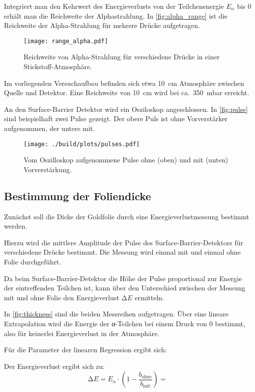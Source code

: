 Integriert man den Kehrwert des Energieverlusts von der Teilchenenergie $E_{\alpha}$ bis $0$ erhält man die Reichweite der Alphastrahlung.
In \autoref{fig:alpha_range} ist die Reichweite der Alpha-Strahlung für mehrere Drücke aufgetragen.

\begin{figure}
  \centering
  \texttt{[image: range\_alpha.pdf]}
  \caption{Reichweite von Alpha-Strahlung für verschiedene Drücke in einer Stickstoff-Atmosphäre.}
  \label{fig:alpha_range}
\end{figure}

Im vorliegenden Versuchaufbau befinden sich etwa \SI{10}{\cm} Atmosphäre zwischen Quelle und Detektor.
Eine Reichweite von \SI{10}{\centi\meter} wird bei ca.\  \SI{350}{\milli\bar} erreicht.

An den Surface-Barrier Detektor wird ein Osziloskop angeschlossen.
In \autoref{fig:pulse} sind beispielhaft zwei Pulse gezeigt.
Der obere Puls ist ohne Vorverstärker aufgenommen, der untere mit.

\begin{figure}
  \centering
  \texttt{[image: ./build/plots/pulses.pdf]}
  \caption{%
    Vom Oszilloskop aufgenommene Pulse ohne (oben) und mit (unten) Vorverstärkung.
  }%
  \label{fig:pulse}
\end{figure}


\subsection{Bestimmung der Foliendicke}

Zunächst soll die Dicke der Goldfolie durch eine Energieverlustmessung bestimmt werden.

Hierzu wird die mittlere Amplitude der Pulse des
Surface-Barrier-Detektors für verschiedene Drücke bestimmt.
Die Messung wird einmal mit und einmal ohne Folie durchgeführt.

Da beim Surface-Barrier-Detektor die Höhe der Pulse proportional zur Energie der eintreffenden Teilchen ist,
kann über den Unterschied zwischen der Messung mit und ohne Folie den Energieverlust $\increment E$ ermitteln.

In \autoref{fig:thickness} sind die beiden Messreihen aufgetragen.
Über eine lineare Extrapolation wird die Energie der α-Teilchen bei einem Druck von $0$ bestimmt, also für keinerlei Energieverlust in der Atmosphäre.

Für die Parameter der linearen Regression ergibt sich:

Der Energieverlust ergibt sich zu:
\begin{equation}
  \increment E = E_α \cdot \left(1 - \frac{b_\text{ohne}}{b_\text{mit}}\right)
  = 
\end{equation}

